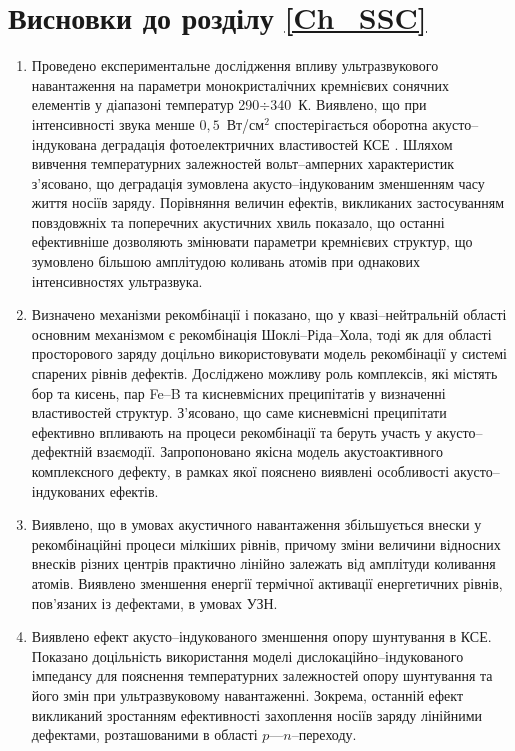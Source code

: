 \section*{Висновки до розділу \ref{Ch_SSC}}
  \begin{enumerate}[leftmargin=0cm,itemindent=3em]
     \item Проведено експериментальне дослідження впливу ультразвукового навантаження на параметри монокристалічних кремнієвих сонячних елементів
     у діапазоні температур 290$\div$340~К.
     Виявлено, що при інтенсивності звука менше $0,5$~Вт/см$^2$ спостерігається оборотна акусто--індукована деградація фотоелектричних властивостей КСЕ .
     Шляхом вивчення температурних залежностей вольт--амперних характеристик з'ясовано, що  деградація  зумовлена акусто--індукованим зменшенням часу життя носіїв заряду.
     Порівняння величин ефектів, викликаних застосуванням повздовжніх та поперечних акустичних хвиль  показало, що останні ефективніше дозволяють змінювати параметри кремнієвих структур, що зумовлено більшою амплітудою коливань атомів при однакових інтенсивностях ультразвука.


     \item Визначено механізми рекомбінації і показано, що у квазі--нейтральній області основним механізмом є рекомбінація Шоклі--Ріда--Хола,
     тоді як для області просторового заряду доцільно використовувати модель рекомбінації у системі спарених рівнів дефектів.
     Досліджено можливу роль комплексів, які містять бор та кисень, пар Fe--B та кисневмісних преципітатів у визначенні властивостей структур.
З'ясовано, що саме кисневмісні преципітати ефективно впливають на процеси рекомбінації та беруть участь у акусто--дефектній взаємодії.
Запропоновано якісна модель акустоактивного комплексного дефекту, в рамках якої пояснено виявлені особливості акусто--індукованих ефектів.


     \item Виявлено, що в умовах акустичного навантаження збільшується внески у рекомбінаційні процеси мілкіших рівнів, причому зміни величини відносних внесків різних центрів  практично лінійно залежать від амплітуди коливання атомів.
         Виявлено зменшення енергії термічної активації енергетичних рівнів, пов'язаних із дефектами, в умовах УЗН.

     \item Виявлено ефект акусто--індукованого зменшення  опору шунтування в КСЕ.
      Показано доцільність використання моделі дислокаційно--індукованого імпедансу для пояснення температурних залежностей  опору шунтування та його змін при ультразвуковому навантаженні.
      Зокрема, останній ефект викликаний зростанням ефективності захоплення носіїв заряду лінійними дефектами,
      розташованими в області $p$---$n$--переходу.




\end{enumerate}
